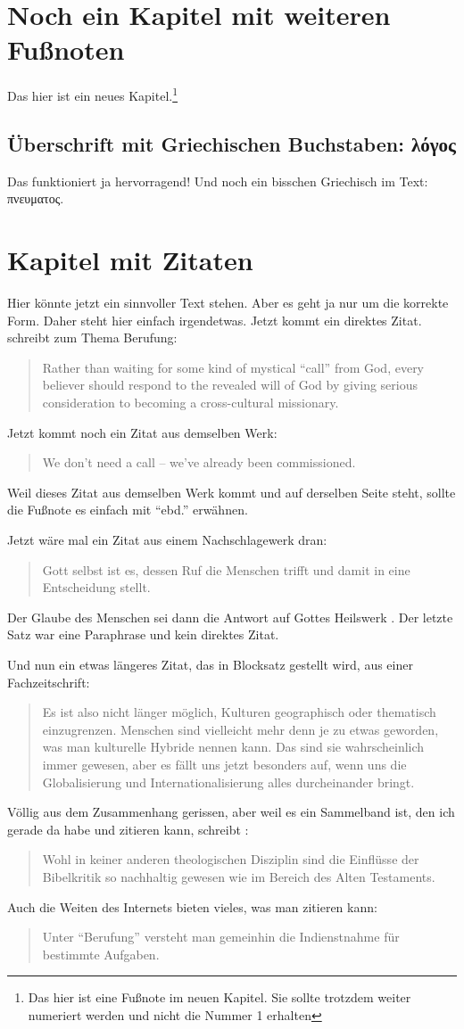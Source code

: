 \documentclass{scrreport}
\begin{document}
\chapter{Noch ein Kapitel mit weiteren Fußnoten}
Das hier ist ein neues Kapitel.\footnote{Das hier ist eine Fußnote im neuen Kapitel. Sie sollte trotzdem weiter numeriert werden und nicht die Nummer 1 erhalten}

\section{Überschrift mit Griechischen Buchstaben: λόγος}
Das funktioniert ja hervorragend! Und noch ein bisschen Griechisch im Text: πνευματος.

\chapter{Kapitel mit Zitaten}
Hier könnte jetzt ein sinnvoller Text stehen. Aber es geht ja nur um die korrekte Form. Daher steht hier einfach irgendetwas. Jetzt kommt ein direktes Zitat. \citeauthor*{friesen} schreibt zum Thema Berufung: \blockcquote[][330]{friesen}{Rather than waiting for some kind of mystical \enquote{call} from God, every believer should respond to the revealed will of God by giving serious consideration to becoming a cross-cultural missionary.} Jetzt kommt noch ein Zitat aus demselben Werk: \blockcquote[][330]{friesen}{We don't need a call -- we've already been commissioned.} Weil dieses Zitat aus demselben Werk kommt und auf derselben Seite steht, sollte die Fußnote es einfach mit \enquote{ebd.} erwähnen.

Jetzt wäre mal ein Zitat aus einem Nachschlagewerk dran: \blockcquote[][80]{rienecker}{Gott selbst ist es, dessen Ruf die Menschen trifft und damit in eine Entscheidung stellt.} Der Glaube des Menschen sei dann die Antwort auf Gottes Heilswerk \autocite[Vgl.][]{rienecker}. Der letzte Satz war eine Paraphrase und kein direktes Zitat.

Und nun ein etwas längeres Zitat, das in Blocksatz gestellt wird, aus einer Fachzeitschrift: \blockcquote[][]{dahl}{Es ist also nicht länger möglich, Kulturen geographisch oder thematisch einzugrenzen. Menschen sind vielleicht mehr denn je zu etwas geworden, was man kulturelle Hybride nennen kann. Das sind sie wahrscheinlich immer gewesen, aber es fällt uns jetzt besonders auf, wenn uns die Globalisierung und Internationalisierung alles durch\-einander bringt.}

Völlig aus dem Zusammenhang gerissen, aber weil es ein Sammelband ist, den ich gerade da habe und zitieren kann, schreibt \citeauthor*{hilbrands}: \blockcquote[][49]{hilbrands}{Wohl in keiner anderen theologischen Disziplin sind die Einflüsse der Bibelkritik so nachhaltig gewesen wie im Bereich des Alten Testaments.}

Auch die Weiten des Internets bieten vieles, was man zitieren kann: \blockcquote[][]{strecker}{Unter \enquote{Berufung} versteht man gemeinhin die \textelp{} Indienstnahme für bestimmte Aufgaben.}

\newpage
\printbibliography[title=Literaturverzeichnis]

\newpage
\printindex

\newpage
\statementofauthorship
\end{document}
